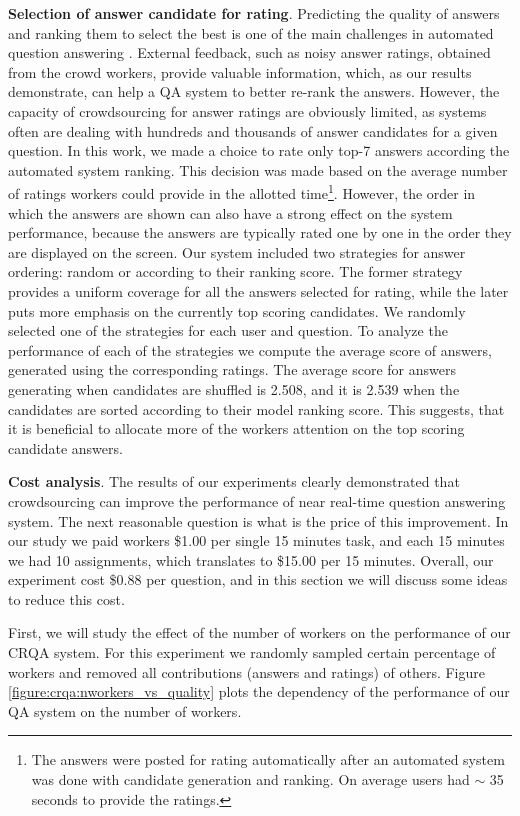 \textbf{Selection of answer candidate for rating}.
Predicting the quality of answers and ranking them to select the best is one of the main challenges in automated question answering \cite{surdeanu2011learning}.
External feedback, such as noisy answer ratings, obtained from the crowd workers, provide valuable information, which, as our results demonstrate, can help a QA system to better re-rank the answers.
However, the capacity of crowdsourcing for answer ratings are obviously limited, as systems often are dealing with hundreds and thousands of answer candidates for a given question.
In this work, we made a choice to rate only top-7 answers according the automated system ranking.
This decision was made based on the average number of ratings workers could provide in the allotted time\footnote{The answers were posted for rating automatically after an automated system was done with candidate generation and ranking. On average users had $\sim$ 35 seconds to provide the ratings.}.
However, the order in which the answers are shown can also have a strong effect on the system performance, because the answers are typically rated one by one in the order they are displayed on the screen.
Our system included two strategies for answer ordering: random or according to their ranking score.
The former strategy provides a uniform coverage for all the answers selected for rating, while the later puts more emphasis on the currently top scoring candidates.
We randomly selected one of the strategies for each user and question.
To analyze the performance of each of the strategies we compute the average score of answers, generated using the corresponding ratings.
The average score for answers generating when candidates are shuffled is 2.508, and it is 2.539 when the candidates are sorted according to their model ranking score.
This suggests, that it is beneficial to allocate more of the workers attention on the top scoring candidate answers.

\textbf{Cost analysis}.
The results of our experiments clearly demonstrated that crowdsourcing can improve the performance of near real-time question answering system.
The next reasonable question is what is the price of this improvement.
In our study we paid workers \$1.00 per single 15 minutes task, and each 15 minutes we had 10 assignments, which translates to \$15.00 per 15 minutes.
Overall, our experiment cost \$0.88 per question, and in this section we will discuss some ideas to reduce this cost.

First, we will study the effect of the number of workers on the performance of our CRQA system.
For this experiment we randomly sampled certain percentage of workers and removed all contributions (answers and ratings) of others.
Figure \ref{figure:crqa:nworkers_vs_quality} plots the dependency of the performance of our QA system on the number of workers.

